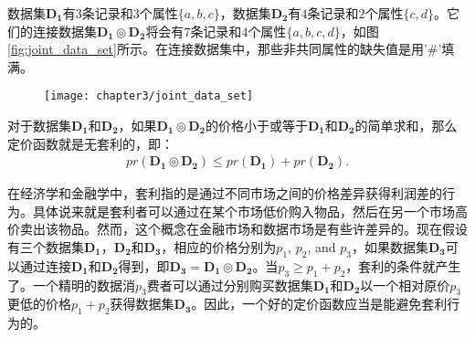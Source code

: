\begin{exmp}
数据集$\bm{D_1}$有$3$条记录和$3$个属性$\{a,b,c\}$，数据集$\bm{D_2}$有$4$条记录和$2$个属性$\{c,d\}$。它们的连接数据集$\bm{D_1} \circledcirc \bm{D_2}$将会有$7$条记录和$4$个属性$\{a,b,c,d\}$，如图\ref{fig:joint_data_set}所示。在连接数据集中，那些非共同属性的缺失值是用'\#'填满。
\end{exmp}

\begin{figure}[h]
  \centering
    \texttt{[image: chapter3/joint\_data\_set]}
\end{figure}

\begin{propt}[定价函数的无套利性]
对于数据集$\bm{D_1}$和$\bm{D_2}$，如果$\bm{D_1} \circledcirc \bm{D_2}$的价格小于或等于$\bm{D_1}$和$\bm{D_2}$的简单求和，那么定价函数就是无套利的，即：
\begin{equation}
  \begin{aligned}
  pr(\bm{D_1} \circledcirc \bm{D_2}) \le pr(\bm{D_1})+pr(\bm{D_2}).
  \end{aligned}
\end{equation}
\label{pr:arbitrage-free}
\end{propt}

在经济学和金融学中，套利指的是通过不同市场之间的价格差异获得利润差的行为。具体说来就是套利者可以通过在某个市场低价购入物品，然后在另一个市场高价卖出该物品。然而，这个概念在金融市场和数据市场是有些许差异的。现在假设有三个数据集$\bm{D_1}$，$\bm{D_2}$和$\bm{D_3}$，相应的价格分别为$p_1$, $p_2$, and $p_3$，如果数据集$\bm{D_3}$可以通过连接$\bm{D_1}$和$\bm{D_2}$得到，即$\bm{D_3}=\bm{D_1} \circledcirc \bm{D_2}$。当$p_3\ge p_1+p_2$，套利的条件就产生了。一个精明的数据消$p_3$费者可以通过分别购买数据集$\bm{D_1}$和$\bm{D_2}$以一个相对原价$p_3$更低的价格$p_1+p_2$获得数据集$\bm{D_3}$。因此，一个好的定价函数应当是能避免套利行为的。

